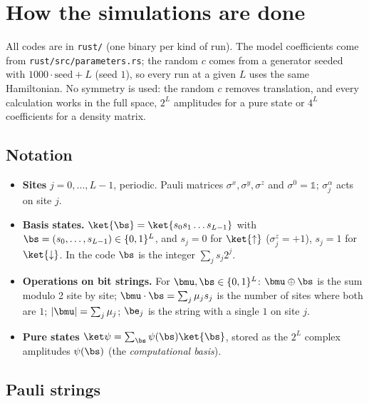 \section{How the simulations are done}
\label{sec:methods}

All codes are in \texttt{rust/} (one binary per kind of run). The model coefficients come from \texttt{rust/\allowbreak src/\allowbreak parameters.rs}; the random $c$ comes from a generator seeded with $1000\cdot\mathrm{seed} + L$ (seed $1$), so every run at a given $L$ uses the same Hamiltonian. No symmetry is used: the random $c$ removes translation, and every calculation works in the full space, $2^L$ amplitudes for a pure state or $4^L$ coefficients for a density matrix.

\subsection{Notation}

\begin{itemize}
\item \textbf{Sites} $j = 0, \dots, L-1$, periodic. Pauli matrices $\sigma^x, \sigma^y, \sigma^z$ and $\sigma^0 = \mathds 1$; $\sigma^\alpha_j$ acts on site $j$.
\item \textbf{Basis states.} $\ket{\bs} = \ket{s_0 s_1\dots s_{L-1}}$ with $\bs = (s_0, \dots, s_{L-1}) \in \{0,1\}^L$, and $s_j = 0$ for $\ket{\uparrow}$ ($\sigma^z_j = +1$), $s_j = 1$ for $\ket{\downarrow}$. In the code $\bs$ is the integer $\sum_j s_j 2^j$.
\item \textbf{Operations on bit strings.} For $\bmu, \bs \in \{0,1\}^L$: $\bmu\oplus\bs$ is the sum modulo 2 site by site; $\bmu\cdot\bs = \sum_j \mu_j s_j$ is the number of sites where both are $1$; $\lvert\bmu\rvert = \sum_j\mu_j$; $\be_j$ is the string with a single $1$ on site $j$.
\item \textbf{Pure states} $\ket\psi = \sum_{\bs}\psi(\bs)\ket{\bs}$, stored as the $2^L$ complex amplitudes $\psi(\bs)$ (the \emph{computational basis}).
\end{itemize}

\subsection{Pauli strings}

